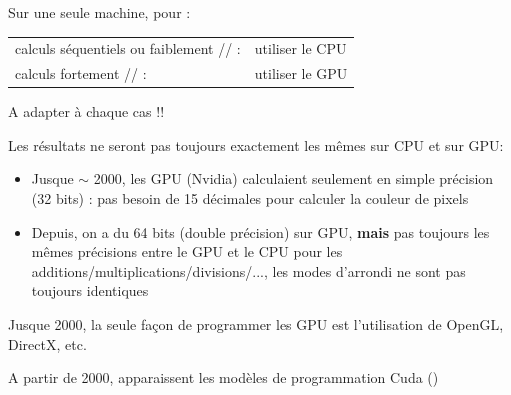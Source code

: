 \documentclass[usenames,dvipsnames]{beamer}
\begin{document}
\begin{frame}
Sur une seule machine, pour :
\begin{tabular}{ll}
calculs séquentiels ou faiblement // :& utiliser le CPU \\
calculs fortement // :& utiliser le GPU
\end{tabular}

\vfill

A adapter à chaque cas !!

\vfill

Les résultats ne seront pas toujours exactement les mêmes sur CPU et sur GPU:
\begin{itemize}
\item Jusque $\sim$ 2000, les GPU (Nvidia) calculaient seulement en simple précision (32 bits) : pas besoin de 15 décimales pour calculer la couleur de pixels
\item Depuis, on a du 64 bits (double précision) sur GPU, {\bfseries mais} pas toujours les mêmes précisions entre le GPU et le CPU pour les additions/multiplications/divisions/..., les modes d'arrondi ne sont pas toujours identiques
\end{itemize}

\end{frame}

\begin{frame}
	Jusque 2000, la seule façon de programmer les GPU est l'utilisation de OpenGL, DirectX, etc.
	
	A partir de 2000, apparaissent les modèles de programmation Cuda ()
\end{frame}

\begin{frame}
\end{frame}

\begin{frame}
\end{frame}
\end{document}
